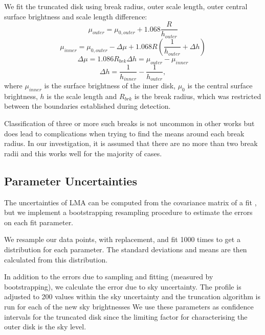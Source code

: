 We fit the truncated disk using break radius, outer scale length, outer central surface brightness and scale length difference:
\begin{equation}
	\mu_{outer} = \mu_{0, outer} + 1.068 \frac{R}{h_{outer}}
\end{equation}
\begin{equation}
	\mu_{inner} = \mu_{0, outer} - \Delta\mu + 1.068R\left(\frac{1}{h_{outer}} + \Delta h\right)
\end{equation}
\begin{equation}
	\Delta \mu = 1.086R_{brk} \Delta h  = \mu_{outer} - \mu_{inner}
\end{equation}
\begin{equation}
	\Delta h = \frac{1}{h_{inner}} - \frac{1}{h_{outer}},
\end{equation}
where $\mu_{inner}$ is the surface brightness of the inner disk, $\mu_{0}$ is the central surface brightness, $h$ is the scale length and $R_{brk}$ is the break radius, which was restricted between the boundaries established during detection.

Classification of three or more such breaks is not uncommon in other works \citep{pohlen_structure_2006,gutierrez_outer_2011} but does lead to complications when trying to find the means around each break radius. In our investigation, it is assumed that there are no more than two break radii and this works well for the majority of cases. 

\subsection{Parameter Uncertainties}
The uncertainties of LMA can be computed from the covariance matrix of a fit \citep{hughes_measurements_2010}, but we implement a bootstrapping resampling procedure to estimate the errors on each fit parameter. 

We resample our data points, with replacement, and fit 1000 times to get a distribution for each parameter. The standard deviations and means are then calculated from this distribution.

In addition to the errors due to sampling and fitting (measured by bootstrapping), we calculate the error due to sky uncertainty. The profile is adjusted to 200 values within the sky uncertainty and the truncation algorithm is run for each of the new sky brightnesses We use these parameters as confidence intervals for the truncated disk since the limiting factor for characterising the outer disk is the sky level.